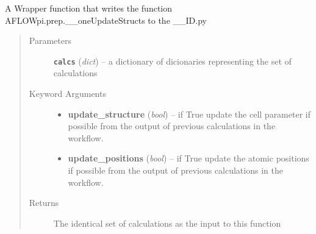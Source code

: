 \documentclass[letterpaper,10pt,english]{sphinxmanual}
\begin{document}

\begin{fulllineitems}
\label{prep:prep.updateStructs}
A Wrapper function that writes the function AFLOWpi.prep.\_\_oneUpdateStructs to the \_\_ID.py
\begin{quote}\begin{description}
\item[{Parameters}] \leavevmode
\textbf{\texttt{calcs}} (\emph{dict}) -- a dictionary of dicionaries representing the set of calculations

\item[{Keyword Arguments}] \leavevmode\begin{itemize}
\item {} 
\textbf{update\_structure} (\emph{bool}) --
if True update the cell parameter if possible from the
output of previous calculations in the workflow.

\item {} 
\textbf{update\_positions} (\emph{bool}) --
if True update the atomic positions if possible from the
output of previous calculations in the workflow.

\end{itemize}

\item[{Returns}] \leavevmode
The identical set of calculations as the input to this function

\end{description}\end{quote}

\end{fulllineitems}


\begin{fulllineitems}
\label{prep:prep.updatelogs}
\end{fulllineitems}

\end{document}
